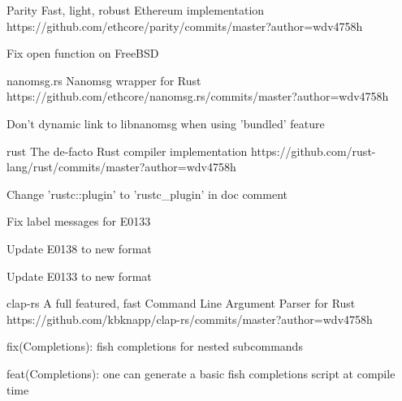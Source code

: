 \begin{cvopensources}
  \cvopensource
    {Parity}
    {Fast, light, robust Ethereum implementation}
    {https://github.com/ethcore/parity/commits/master?author=wdv4758h}
    {
      \begin{cvitems}
        \item {Fix open function on FreeBSD}
      \end{cvitems}
    }

  \cvopensource
    {nanomsg.rs}
    {Nanomsg wrapper for Rust}
    {https://github.com/ethcore/nanomsg.rs/commits/master?author=wdv4758h}
    {
      \begin{cvitems}
        \item {Don't dynamic link to libnanomsg when using 'bundled' feature}
      \end{cvitems}
    }

  \cvopensource
    {rust}
    {The de-facto Rust compiler implementation}
    {https://github.com/rust-lang/rust/commits/master?author=wdv4758h}
    {
      \begin{cvitems}
        \item {Change 'rustc::plugin' to 'rustc\_plugin' in doc comment}
        \item {Fix label messages for E0133}
        \item {Update E0138 to new format}
        \item {Update E0133 to new format}
      \end{cvitems}
    }

  \cvopensource
    {clap-rs}
    {A full featured, fast Command Line Argument Parser for Rust}
    {https://github.com/kbknapp/clap-rs/commits/master?author=wdv4758h}
    {
      \begin{cvitems}   %
        \item {fix(Completions): fish completions for nested subcommands}
        \item {feat(Completions): one can generate a basic fish completions script at compile time}
      \end{cvitems}
    }


\end{cvopensources}
